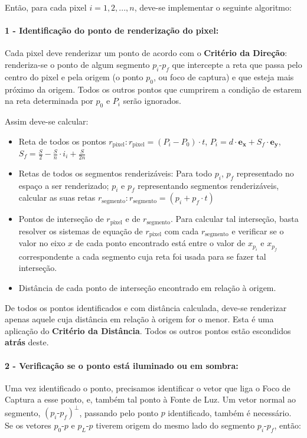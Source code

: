 \documentclass{article}
\begin{document}
	Então, para cada pixel $i = 1, 2, ..., n$, deve-se implementar o seguinte algoritmo:
	
	\paragraph{1 - Identificação do ponto de renderização do pixel:}
	Cada pixel deve renderizar um ponto de acordo com o \textbf{Critério da Direção}: renderiza-se o ponto de algum segmento $p_i$-$p_f$ que intercepte a reta que passa pelo centro do pixel e pela origem (o ponto $p_0$, ou foco de captura) e que esteja mais próximo da origem. Todos os outros pontos que cumprirem a condição de estarem na reta determinada por $p_0$ e $P_i$ serão ignorados.
	
	Assim deve-se calcular:
	
	\begin{itemize}
		\item Reta de todos os pontos $r_\text{pixel} : r_\text{pixel} = (P_i - P_0) \cdot t$, $P_i = d \cdot \boldsymbol{e_x} + S_f \cdot \boldsymbol{e_y}$, $S_f = \frac{S}{2} - \frac{S}{n} \cdot i_i + \frac{S}{2n}$
		\item Retas de todos os segmentos renderizáveis: Para todo $p_i$, $p_f$ representado no espaço a ser renderizado; $p_i$ e $p_f$ representando segmentos renderizáveis, calcular as suas retas $r_\text{segmento}: r_\text{segmento} = (p_i + p_f \cdot t)$
		\item Pontos de interseção de $r_\text{pixel}$ e de $r_\text{segmento}$. Para calcular tal interseção, basta resolver os sistemas de equação de $r_\text{pixel}$ com cada $r_\text{segmento}$ e verificar se o valor no eixo $x$ de cada ponto encontrado está entre o valor de $x_{p_i}$ e $x_{p_f}$ correspondente a cada segmento cuja reta foi usada para se fazer tal interseção. 
		\item Distância de cada ponto de interseção encontrado em relação à origem.
	\end{itemize}
	 
	De todos os pontos identificados e com distância calculada, deve-se renderizar apenas aquele cuja distância em relação à origem for o menor. Esta é uma aplicação do \textbf{Critério da Distância}. Todos os outros pontos estão escondidos \textbf{atrás} deste.
	
	\paragraph{2 - Verificação se o ponto está iluminado ou em sombra:}
	Uma vez identificado o ponto, precisamos identificar o vetor que liga o Foco de Captura a esse ponto, e, também tal ponto à Fonte de Luz. Um vetor normal ao segmento,  $(p_i\text{-}p_f)^\bot$, passando pelo ponto $p$ identificado, também é necessário. Se os vetores $p_0$-$p$ e $p_{L}$-$p$ tiverem origem do mesmo lado do segmento $p_i$-$p_f$, então:
	
\end{document}
